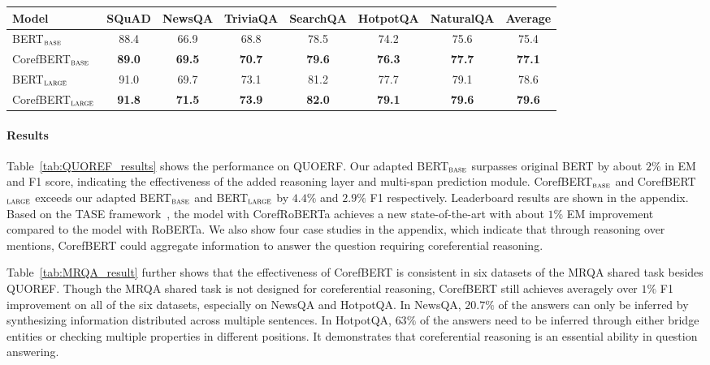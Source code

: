 \documentclass[11pt,a4paper]{article}
\newcommand\CorefBERT{CorefBERT\xspace}
\newcommand\BASESIZE{$_{\small \textsc{base}}$\xspace}
\newcommand\LARGESIZE{$_{\small \textsc{large}}$\xspace}
\begin{document}
\begin{table*}[!t]
\small
\centering
\setlength{\tabcolsep}{8pt}
\begin{tabular}{lccccccc}
\toprule

 Model &    {SQuAD} & {NewsQA}  & {TriviaQA} & {SearchQA} &{HotpotQA} &{NaturalQA} & Average  \\
\midrule
BERT\BASESIZE  & 88.4& 66.9 &68.8  & 78.5  & 74.2  & 75.6 & 75.4 \\
CorefBERT\BASESIZE  &   \bf{89.0}& \bf{69.5}& \bf{70.7} & \bf{79.6} & \bf{76.3} & \bf{77.7} & \bf{77.1}\\ 
\midrule
BERT\LARGESIZE  & 91.0& 69.7 & 73.1  & 81.2  & 77.7  & 79.1 & 78.6 \\
CorefBERT\LARGESIZE  &\bf{91.8} & \bf{71.5} &  \bf{73.9} & \bf{82.0}  & \bf{79.1}  & \bf{79.6} &  \bf{79.6}\\
\bottomrule
\end{tabular}
\caption{Performance (F1)  on six MRQA extractive question answering benchmarks.} \label{tab:MRQA_result}
\end{table*}










\vspace{-0.1em}
\paragraph{Results} Table~\ref{tab:QUOREF_results} shows the performance on QUOERF. Our
adapted BERT\BASESIZE surpasses original BERT by about $2\%$ in EM and F1 score, indicating the effectiveness of the added reasoning layer and multi-span prediction module. CorefBERT\BASESIZE and CorefBERT\LARGESIZE  exceeds our adapted BERT\BASESIZE and BERT\LARGESIZE by  $4.4\%$ and $2.9\%$ F1 respectively. Leaderboard results are shown in the appendix. Based on the TASE framework~\citep{TASE}, the model with CorefRoBERTa achieves a new state-of-the-art with about $1\%$ EM improvement compared to the model with RoBERTa.
We also show four case studies in the appendix, which indicate that through reasoning over mentions, \CorefBERT could aggregate information to answer the question requiring coreferential reasoning. 




Table~\ref{tab:MRQA_result} further shows that the effectiveness of \CorefBERT is consistent in six datasets of the MRQA shared task besides QUOREF. Though the MRQA shared task is not designed for coreferential reasoning, CorefBERT still achieves averagely over $1\%$ F1 improvement on all of the six datasets, especially on NewsQA and HotpotQA. In NewsQA, $20.7\%$ of the answers can only be inferred by synthesizing information distributed across multiple sentences.  In HotpotQA,  $63\%$ of the answers need to be inferred through either bridge entities or checking multiple properties in different positions. It demonstrates that coreferential reasoning is an essential ability in question answering.
\end{document}
